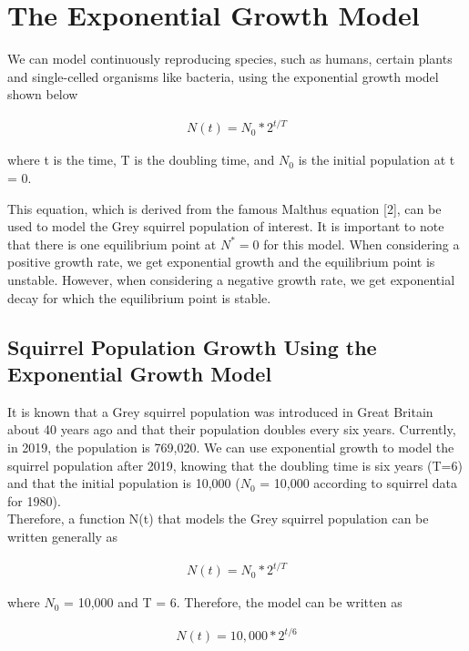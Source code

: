 \documentclass[12pt]{article}
\begin{document}
\section{The Exponential Growth Model}
We can model continuously reproducing species, such as humans, certain plants and single-celled organisms like bacteria, using the exponential growth model shown below \

\begin{gather*}
N(t) = N_0*2^{t/T}
\end{gather*}

where t is the time, T is the doubling time, and $N_0$ is the initial population at t = 0. 

This equation, which is derived from the famous Malthus equation [2], can be used to model the Grey squirrel population of interest. It is important to note that there is one equilibrium point at $N^{*}=0$ for this model. When considering a positive growth rate, we get exponential growth and the equilibrium point is unstable. However, when considering a negative growth rate, we get exponential decay for which the equilibrium point is stable.


\subsection*{Squirrel Population Growth Using the Exponential Growth Model}
It is known that a Grey squirrel population was introduced in Great Britain about 40 years ago and that their population doubles every six years. Currently, in 2019, the population is 769,020. We can use exponential growth to model the squirrel population after 2019, knowing that the doubling time is six years (T=6) and that the initial population is 10,000 ($N_0$ = 10,000 according to squirrel data for 1980).\\

Therefore, a function N(t) that models the Grey squirrel population can be written generally as

\begin{gather*}
N(t) = N_0*2^{t/T}
\end{gather*}

where $N_0$ = 10,000 and T = 6. Therefore, the model can be written as\

\begin{gather*}
N(t) = 10,000*2^{t/6}
\end{gather*}
\end{document}
